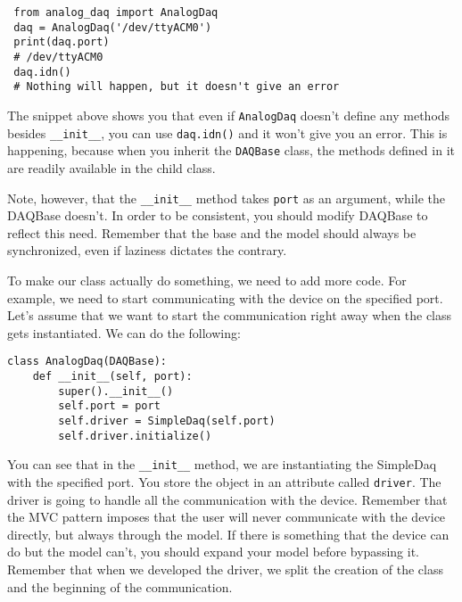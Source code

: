 \begin{verbatim}
 from analog_daq import AnalogDaq
 daq = AnalogDaq('/dev/ttyACM0')
 print(daq.port)
 # /dev/ttyACM0
 daq.idn()
 # Nothing will happen, but it doesn't give an error
\end{verbatim}

The snippet above shows you that even if \texttt{AnalogDaq} doesn't define any methods besides \texttt{__init__}, you can use \texttt{daq.idn()} and it won't give you an error. This is happening, because when you inherit the \texttt{DAQBase} class, the methods defined in it are readily available in the child class. 

Note, however, that the \texttt{__init__} method takes \texttt{port} as an argument, while the DAQBase doesn't. In order to be consistent, you should modify DAQBase to reflect this need. Remember that the base and the model should always be synchronized, even if laziness dictates the contrary. 


To make our class actually do something, we need to add more code. For example, we need to start communicating with the device on the specified port. Let's assume that we want to start the communication right away when the class gets instantiated. We can do the following:

\begin{verbatim}
class AnalogDaq(DAQBase):
    def __init__(self, port):
        super().__init__()
        self.port = port
        self.driver = SimpleDaq(self.port)
        self.driver.initialize()
\end{verbatim}

You can see that in the \texttt{__init__} method, we are instantiating the SimpleDaq with the specified port. You store the
object in an attribute called \texttt{driver}. The driver is going to handle all the communication with the device. Remember that the {MVC} pattern imposes that the user will never communicate with the device directly, but always through the model. If there is something that the device can do but the model can't, you should expand your model before bypassing it. Remember that when we developed the driver, we split the creation of the class and the beginning of the communication. 


